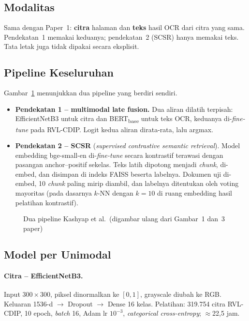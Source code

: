 \subsection{Modalitas}
Sama dengan Paper~1: \textbf{citra} halaman dan \textbf{teks} hasil OCR dari citra yang
sama. Pendekatan~1 memakai keduanya; pendekatan~2 (SCSR) hanya memakai teks. Tata letak
juga tidak dipakai secara eksplisit.

\subsection{Pipeline Keseluruhan}
Gambar~\ref{fig:pipeline-kashyap} menunjukkan dua pipeline yang berdiri sendiri.
\begin{itemize}
  \item \textbf{Pendekatan 1 -- multimodal late fusion.} Dua aliran dilatih terpisah:
        EfficientNetB3 untuk citra dan BERT\textsubscript{base} untuk teks OCR, keduanya
        di-\emph{fine-tune} pada RVL-CDIP. Logit kedua aliran dirata-rata, lalu argmax.
  \item \textbf{Pendekatan 2 -- SCSR} (\emph{supervised contrastive semantic retrieval}).
        Model embedding bge-small-en di-\emph{fine-tune} secara kontrastif terawasi dengan
        pasangan anchor--positif sekelas. Teks latih dipotong menjadi \emph{chunk},
        di-embed, dan disimpan di indeks FAISS beserta labelnya. Dokumen uji di-embed,
        10 \emph{chunk} paling mirip diambil, dan labelnya ditentukan oleh voting mayoritas
        (pada dasarnya $k$-NN dengan $k=10$ di ruang embedding hasil pelatihan kontrastif).
\end{itemize}

\begin{figure}[H]
  \centering
  
  \caption{Dua pipeline Kashyap et al.\ (digambar ulang dari Gambar~1 dan~3 paper)}
  \label{fig:pipeline-kashyap}
\end{figure}

\subsection{Model per Unimodal}
\paragraph{Citra -- EfficientNetB3.} Input $300\times300$, piksel dinormalkan ke $[0,1]$,
grayscale diubah ke RGB. Keluaran 1536-d $\to$ Dropout $\to$ Dense 16 kelas. Pelatihan:
319.754 citra RVL-CDIP, 10 epoch, \emph{batch} 16, Adam lr $10^{-3}$, \emph{categorical
cross-entropy}; $\approx$22,5 jam.

